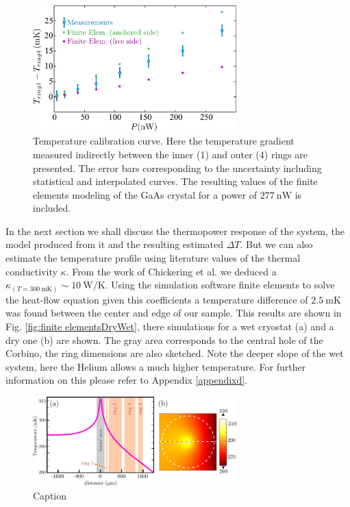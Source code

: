 \begin{figure}
    \centering
    \includegraphics[width=0.7\textwidth]{figures/temperature_corbino/deltaTpower_COMSOL.pdf}
    \caption{Temperature calibration curve. Here the temperature gradient measured indirectly between the inner (1) and outer (4) rings are presented. The error bars corresponding to the uncertainty including statistical and interpolated curves. The resulting values of the finite elements modeling of the GaAs crystal for a power of $\SI{277}{\nano\watt}$ is included.}
    \label{fig:deltaTpower}
\end{figure}


In the next section we shall discuss the thermopower response of the system, the model produced from it and the resulting estimated $\Delta T$. 
But we can also estimate the temperature profile using literature values of the thermal conductivity $\kappa$. From the work of Chickering et al.\cite{chickering2013} we deduced a $\kappa_(T = \SI{300}{\milli\kelvin}) \sim \SI{10}{\watt\per\kelvin}$. Using the simulation software finite elements to solve the heat-flow equation given this coefficients a temperature difference of $\SI{2.5}{\milli\kelvin}$ was found between the center and edge of our sample. This results are shown in Fig. \ref{fig:finite elementsDryWet}, there simulations for a wet cryostat (a) and a dry one (b) are shown. The gray area corresponds to the central hole of the Corbino, the ring dimensions are also sketched. Note the deeper slope of the wet system, here the Helium allows a much higher temperature. For further information on this please refer to Appendix \ref{appendixd}. 

\begin{figure}
    \centering
    \includegraphics[width=0.7\textwidth]{figures/temperature_corbino/comsol_helium.pdf}
    \caption{Caption}
    \label{fig:finiteElementHe}
\end{figure}

